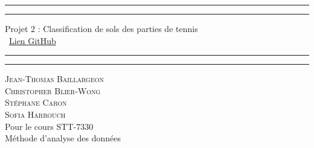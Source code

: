 \begin{titlepage}
	\centering %
	
	\scshape %
	
	\vspace*{\baselineskip} %
	
	
	\rule{\textwidth}{1.6pt}\vspace*{-\baselineskip}\vspace*{2pt} %
	\rule{\textwidth}{0.4pt} %
	
	\vspace{0.75\baselineskip} %
	
	{\LARGE Projet 2 : Classification de sols des parties de tennis\\} %
	\ \href{https://github.com/stecaron/stt-7330-projet-2}{Lien GitHub}
	\vspace{0.75\baselineskip} %
	
	\rule{\textwidth}{0.4pt}\vspace*{-\baselineskip}\vspace{3.2pt} %
	\rule{\textwidth}{1.6pt} %
	
	\vspace{2\baselineskip} %
	
	{\scshape\Large Jean-Thomas Baillargeon \\Christopher Blier-Wong\\Stéphane Caron\\Sofia Harrouch\\} %
	Pour le cours STT-7330\\
	Méthode d'analyse des données \\%
	
	\vspace*{3\baselineskip} %
	
	

\end{titlepage}
